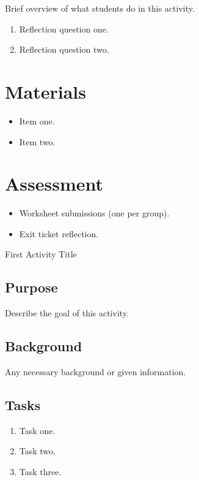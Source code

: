 \documentclass[11pt,a4paper]{article}
\begin{document}

Brief overview of what students do in this activity.

\begin{enumerate}
  \item Reflection question one.
  \item Reflection question two.
\end{enumerate}

\section*{Materials}
\begin{itemize}
  \item Item one.
  \item Item two.
\end{itemize}

\section*{Assessment}
\begin{itemize}
  \item Worksheet submissions (one per group).
  \item Exit ticket reflection.
\end{itemize}



\begin{activity}{First Activity Title}

\subsection*{Purpose}

Describe the goal of this activity.

\subsection*{Background}

Any necessary background or given information.

\subsection*{Tasks}
\begin{enumerate}
  \item Task one.
  \item Task two.
  \item Task three.
\end{enumerate}

\end{activity}
\end{document}

